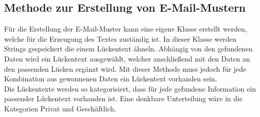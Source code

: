 
	\subsection{Methode zur Erstellung von E-Mail-Mustern}
	Für die Erstellung der E-Mail-Muster kann eine eigene Klasse erstellt werden, welche für die Erzeugung des Textes zuständig ist. In dieser Klasse werden Strings gespeichert die einem Lückentext ähneln. Abhängig von den gefundenen Daten wird ein Lückentext ausgewählt, welcher anschließend mit den Daten an den passenden Lücken ergänzt wird. Mit dieser Methode muss jedoch für jede Kombination aus gewonnenen Daten ein Lückentext vorhanden sein.\\
	Die Lückentexte werden so kategorisiert, dass für jede gefundene Information ein passender Lückentext vorhanden ist. Eine denkbare Unterteilung wäre in die Kategorien Privat und Geschäftlich.

